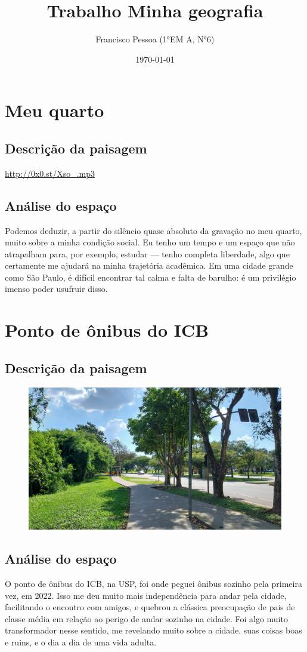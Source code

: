 \documentclass[12pt]{article}
\author{Francisco Pessoa (1°EM A, N°6)}
\title{Trabalho \textbf{Minha geografia}}
\date{\today}
\begin{document}
\maketitle

\section{Meu quarto}
\subsection{Descrição da paisagem}
\url{http://0x0.st/Xso_.mp3}
\subsection{Análise do espaço}
Podemos deduzir, a partir do silêncio quase absoluto da gravação no meu quarto, muito sobre a minha condição social. Eu tenho um tempo e um espaço que não atrapalham para, por exemplo, estudar — tenho completa liberdade, algo que certamente me ajudará na minha trajetória acadêmica. Em uma cidade grande como São Paulo, é difícil encontrar tal calma e falta de barulho: é um privilégio imenso poder usufruir disso.

\section{Ponto de ônibus do ICB}
\subsection{Descrição da paisagem}
\begin{figure}[H]
    \centering
    \includegraphics[width = \textwidth]{./img/Ponto.jpg}
\end{figure}
\subsection{Análise do espaço}
O ponto de ônibus do ICB, na USP, foi onde peguei ônibus sozinho pela primeira vez, em 2022. Isso me deu muito mais independência para andar pela cidade, facilitando o encontro com amigos, e quebrou a clássica preocupação de pais de classe média em relação ao perigo de andar sozinho na cidade. Foi algo muito transformador nesse sentido, me revelando muito sobre a cidade, suas coisas boas e ruins, e o dia a dia de uma vida adulta.
\end{document}

